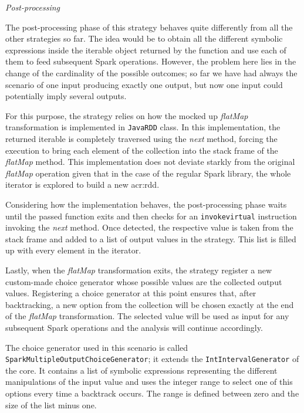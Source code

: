 \textit{Post-processing}

The post-processing phase of this strategy behaves quite differently from all the other strategies so far. The idea would be to obtain all the different symbolic expressions inside the iterable object returned by the function and use each of them to feed subsequent Spark operations. However, the problem here lies in the change of the cardinality of the possible outcomes; so far we have had always the scenario of one input producing exactly one output, but now one input could potentially imply several outputs.

For this purpose, the strategy relies on how the mocked up \textit{flatMap} transformation is implemented in \texttt{JavaRDD} class. In this implementation, the returned iterable is completely traversed using the \textit{next} method, forcing the execution to bring each element of the collection into the stack frame of the \textit{flatMap} method. This implementation does not deviate starkly from the original \textit{flatMap} operation given that in the case of the regular Spark library, the whole iterator is explored to build a new \acrshort{acr:rdd}.

Considering how the implementation behaves, the post-processing phase waits until the passed function exits and then checks for an \texttt{invokevirtual} instruction invoking the \textit{next} method. Once detected, the respective value is taken from the stack frame and added to a list of output values in the strategy. This list is filled up with every element in the iterator.

Lastly, when the \textit{flatMap} transformation exits, the strategy register a new custom-made choice generator whose possible values are the collected output values. Registering a choice generator at this point ensures that, after backtracking, a new option from the collection will be chosen exactly at the end of the \textit{flatMap} transformation. The selected value will be used as input for any subsequent Spark operations and the analysis will continue accordingly.

The choice generator used in this scenario is called \texttt{SparkMultipleOutputChoiceGenerator}; it extends the \texttt{IntIntervalGenerator} of the \jpf{}
core. It contains a list of symbolic expressions representing the different manipulations of the input value and uses the integer range to select one of this options every time a backtrack occurs. The range is defined between zero and the size of the list minus one.
